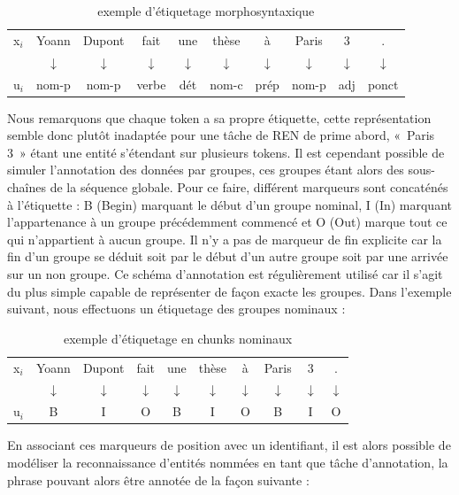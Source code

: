 \documentclass[12pt,a4paper,times,twoside,openright]{report}
\begin{document}
\begin{table}[ht!]
\centering
\begin{tabular}{lccccccccc}
x$_{i}$ & Yoann & Dupont & fait & une & thèse & à & Paris & 3 & . \\
        & $\downarrow$ & $\downarrow$ & $\downarrow$ & $\downarrow$ & $\downarrow$ & $\downarrow$ & $\downarrow$ & $\downarrow$ & $\downarrow$ \\
u$_{i}$ & nom-p & nom-p & verbe & dét & nom-c & prép & nom-p & adj & ponct \\
\end{tabular}
\caption{exemple d'étiquetage morphosyntaxique}
\label{tab:POS-tagging-example}
\end{table}

Nous remarquons que chaque token a sa propre étiquette, cette représentation semble donc plutôt inadaptée pour une tâche de REN de prime abord, «\ Paris 3\ » étant une entité s'étendant sur plusieurs tokens. Il est cependant possible de simuler l'annotation des données par groupes, ces groupes étant alors des sous-chaînes de la séquence globale. Pour ce faire, différent marqueurs sont concaténés à l'étiquette : B (Begin) marquant le début d'un groupe nominal, I (In) marquant l'appartenance à un groupe précédemment commencé et O (Out) marque tout ce qui n'appartient à aucun groupe. Il n'y a pas de marqueur de fin explicite car la fin d'un groupe se déduit soit par le début d'un autre groupe soit par une arrivée sur un non groupe. Ce schéma d'annotation est régulièrement utilisé car il s'agit du plus simple capable de représenter de façon exacte les groupes. Dans l'exemple suivant, nous effectuons un étiquetage des groupes nominaux :

\begin{table}[ht!]
\centering
\begin{tabular}{lccccccccc}
x$_{i}$ & Yoann & Dupont & fait & une & thèse & à & Paris & 3 & . \\
        & $\downarrow$ & $\downarrow$ & $\downarrow$ & $\downarrow$ & $\downarrow$ & $\downarrow$ & $\downarrow$ & $\downarrow$ & $\downarrow$ \\
u$_{i}$ & B & I & O & B & I & O & B & I & O \\
\end{tabular}
\caption{exemple d'étiquetage en chunks nominaux}
\label{tab:NP-chunking-example}
\end{table}

En associant ces marqueurs de position avec un identifiant, il est alors possible de modéliser la reconnaissance d'entités nommées en tant que tâche d'annotation, la phrase pouvant alors être annotée de la façon suivante :
\end{document}
